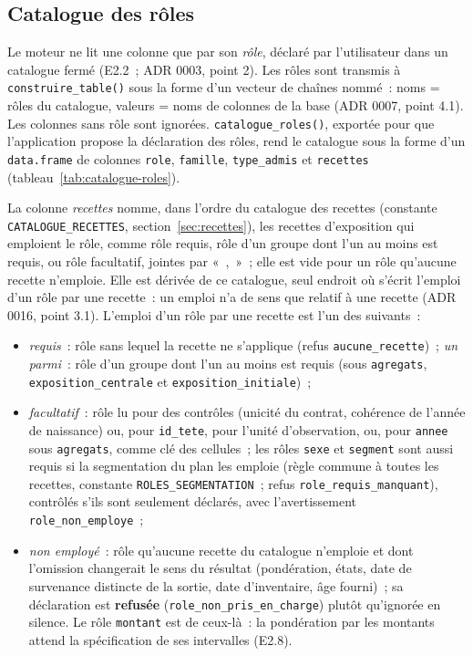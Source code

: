\documentclass[a4paper,11pt]{article}
\newcommand{\code}[1]{\texttt{\small #1}}
\begin{document}
\subsection{Catalogue des rôles}
\label{sec:catalogue-roles}

Le moteur ne lit une colonne que par son \emph{rôle}, déclaré par
l'utilisateur dans un catalogue fermé (E2.2~; ADR 0003, point 2). Les rôles
sont transmis à \code{construire\_table()} sous la forme d'un vecteur de
chaînes nommé~: noms = rôles du catalogue, valeurs = noms de colonnes de la
base (ADR 0007, point 4.1). Les colonnes sans rôle sont ignorées.
\code{catalogue\_roles()}, exportée pour que l'application propose la
déclaration des rôles, rend le catalogue sous la forme d'un \code{data.frame}
de colonnes \code{role}, \code{famille}, \code{type\_admis} et
\code{recettes} (tableau~\ref{tab:catalogue-roles}).

\medskip
{\sloppy{} La colonne \emph{recettes} nomme, dans l'ordre du
catalogue des recettes (constante \code{CATALOGUE\_RECETTES},
section~\ref{sec:recettes}), les recettes d'exposition qui emploient le rôle,
comme rôle requis, rôle d'un groupe dont l'un au moins est requis, ou rôle
facultatif, jointes par «~,~»~; elle est vide pour un rôle qu'aucune recette
n'emploie. Elle est dérivée de ce catalogue, seul endroit où s'écrit l'emploi
d'un rôle par une recette~: un emploi n'a de sens que relatif à une recette
(ADR 0016, point 3.1). L'emploi d'un rôle par une recette est l'un des
suivants~:\par}

\begin{itemize}[leftmargin=*, itemsep=2pt]
  \item \emph{requis}~: rôle sans lequel la recette ne s'applique (refus
    \code{aucune\_recette})~; \emph{un parmi}~: rôle d'un groupe dont l'un
    au moins est requis (sous \code{agregats}, \code{exposition\_centrale}
    et \code{exposition\_initiale})~;
  \item \emph{facultatif}~: rôle lu pour des contrôles (unicité du contrat,
    cohérence de l'année de naissance) ou, pour \code{id\_tete}, pour l'unité
    d'observation, ou, pour \code{annee} sous \code{agregats}, comme clé
    des cellules~; les rôles \code{sexe} et \code{segment} sont aussi requis
    si la segmentation du plan les emploie (règle commune à toutes les
    recettes, constante \code{ROLES\_SEGMENTATION}~; refus
    \code{role\_requis\_manquant}), contrôlés s'ils sont seulement déclarés,
    avec l'avertissement \code{role\_non\_employe}~;
  \item \emph{non employé}~: rôle qu'aucune recette du catalogue
    n'emploie et dont l'omission changerait le sens du résultat (pondération,
    états, date de survenance distincte de la sortie, date
    d'inventaire, âge fourni)~; sa déclaration est \textbf{refusée}
    (\code{role\_non\_pris\_en\_charge}) plutôt qu'ignorée en silence. Le rôle
    \code{montant} est de ceux-là~: la pondération par les montants attend la
    spécification de ses intervalles (E2.8).
\end{itemize}
\end{document}
